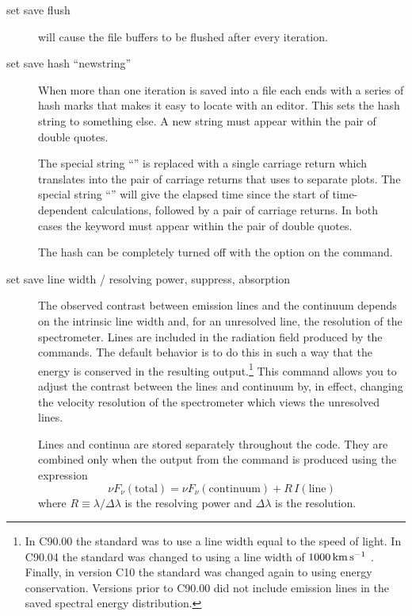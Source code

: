 \begin{description}
\item[set save flush] will cause the file buffers to be flushed after every iteration.

\item[set save hash ``newstring'']
\label{sec:CommandSetSaveHash}
When more than one iteration is saved
into a file each ends with a series of hash marks that makes it easy to
locate with an editor.
This sets the hash string to something else.  A
new string must appear within the pair of double quotes.

The special string ``'' is replaced
with a single carriage return
which translates into the pair of carriage returns that  uses to
separate plots.
The special string ``'' will give the elapsed time
since the start of time-dependent calculations, followed by a pair
of carriage returns.
In both cases the keyword
must appear within the pair of double quotes.

The hash can be completely turned off with the 
option on the  command.

\item[set save line width / resolving power, suppress, absorption]
\label{sec:CommandSetSaveLWidth}
The observed contrast between emission
lines and the continuum depends on the intrinsic line width and,
for an
unresolved line, the resolution of the spectrometer.
Lines are included
in the radiation field produced by the 
commands. The default behavior is to do this in such a way that
the energy is conserved in the resulting output.\footnote{In C90.00 the
standard was to use a line width equal to the speed of light. In C90.04 the
standard was changed to using a line width of $1000 \mbox{${\rm\thinspace km}\mbox{${\rm\thinspace s}^{-1}\,$}\,$}$. Finally, in
version C10 the standard was changed again to using energy conservation.
Versions prior to C90.00 did not include emission lines in the saved
spectral energy distribution.}
This command allows you to adjust the contrast between the lines and continuum by,
in effect, changing the velocity resolution of the spectrometer which views
the unresolved lines.

Lines and continua are stored separately throughout the code.
They are
combined only when the output from the  command is produced using the expression
\begin{equation}
\nu F_\nu  ({\mathrm{total}}) = \nu F_\nu  ({\mathrm{continuum}}) +
R \, I\left( {{\mathrm{line}}} \right)
\label{eqn:LineContinuumContrastFactor}
\end{equation}
where $R \equiv \lambda/\Delta\lambda$ is the resolving power and $\Delta\lambda$ 
is the resolution. 


\end{description}
